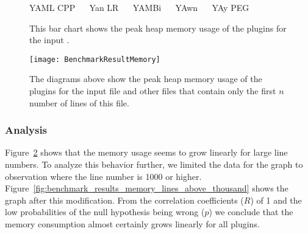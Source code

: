 \begin{figure}[H]
  \begin{bchart}[max=700, width=0.8\textwidth, unit=MB]




  \end{bchart}
  \begin{center}
  \vspace{-0.5cm}
     YAML CPP ~~
     Yan LR ~~
     YAMBi ~~
     YAwn ~~
     YAy PEG
  \vspace{-0.5cm}
  \end{center}
  \caption{This bar chart shows the peak heap memory usage of the plugins for the input \FileGenerated{}.}
  \label{fig:benchmark_memory_generated}
\end{figure}

\begin{figure}[H]
  \centering
    \texttt{[image: BenchmarkResultMemory]}
  \caption{The diagrams above show the peak heap memory usage of the plugins for the input file \FileGeneratedHundredThousand{} and other files that contain only the first $n$ number of lines of this file.}
  \label{fig:benchmark_results_memory_lines}
\end{figure}

\subsubsection{Analysis}

Figure~\ref{fig:benchmark_results_memory_lines} shows that the memory usage seems to grow linearly for large line numbers. To analyze this behavior further, we limited the data for the graph to observation where the line number is 1000 or higher. Figure~\ref{fig:benchmark_results_memory_lines_above_thousand} shows the graph after this modification. From the correlation coefficients ($R$) of 1 and the low probabilities of the null hypothesis being wrong ($p$) we conclude that the memory consumption almost certainly grows linearly for all plugins.

